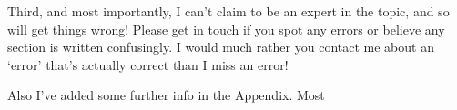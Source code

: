 \documentclass[a4paper,11pt,twoside]{report}
\begin{document}
\begin{sloppypar}
Third, and most importantly, I can't claim to be an expert in the topic, and so will get things wrong! Please get in touch if you spot any errors or believe any section is written confusingly. I would much rather you contact me about an `error' that's actually correct than I miss an error!

Also I've added some further info in the Appendix. Most 
















\end{sloppypar}
\end{document}
